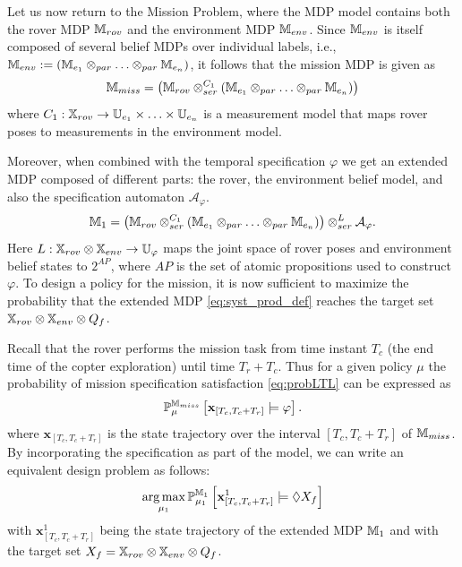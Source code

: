 \documentclass[conference]{IEEEtran}
\begin{document}
Let us now return to the Mission Problem, where the MDP model contains both the rover MDP $\mathbb{M}_{rov}$ and the environment MDP $\mathbb{M}_{env}$. Since $\mathbb{M}_{env}$ is itself composed of several belief MDPs over individual labels, i.e., $\mathbb{M}_{env}:=\left( \mathbb{M}_{e_1} \otimes_{par} \ldots \otimes_{par} \mathbb{M}_{e_n} \right) $, it follows that the mission MDP is given as
\begin{equation}
  \mathbb{M}_{miss} = \left( \mathbb{M}_{rov} \otimes_{ser}^{C_1}\left( \mathbb{M}_{e_1} \otimes_{par} \ldots \otimes_{par} \mathbb{M}_{e_n} \right) \right)
\end{equation}
where $C_1 : \mathbb{X}_{rov} \rightarrow \mathbb{U}_{e_1} \times \ldots \times \mathbb{U}_{e_n}$ is a measurement model that maps rover poses to measurements in the environment model.

Moreover, when combined with the temporal specification $\varphi$ we get an extended MDP composed of different parts: the rover, the environment belief model, and also the specification automaton $\mathcal A_\varphi$.
 \begin{equation}
\label{eq:syst_prod_def}
	\MDP_1 = \left( \MDP_{rov} \otimes_{ser}^{C_1} \left( \MDP_{e_1} \otimes_{par} \ldots \otimes_{par} \MDP_{e_n} \right) \right) \otimes_{ser}^{L} \mathcal A_{\varphi}.
\end{equation}
Here $L : \mathbb{X}_{rov} \otimes \mathbb{X}_{env} \rightarrow \mathbb{U}_{\varphi}$ maps the joint space of rover poses and environment belief states to $2^{AP}$, where $AP$ is the set of atomic propositions used to construct $\varphi$. To design a policy for the mission, it is now sufficient to maximize the probability that the extended MDP \eqref{eq:syst_prod_def} reaches the target set $\mathbb{X}_{rov} \otimes \mathbb{X}_{env} \otimes Q_f$.

Recall that the rover performs the mission task from time instant $T_c$ (the end time of the copter exploration) until time $T_r + T_c$. Thus for a given  policy $\mu$ the probability of mission specification satisfaction \eqref{eq:probLTL} can be expressed as
\begin{equation}
\begin{aligned}
	\mathbb{P}_\mu^{\mathbb{M}_{miss}} \left[ \mathbf{x}_{[T_c,T_c+T_r]} \models \varphi \right].
\end{aligned}
\end{equation}
where $\mathbf{x}_{[T_c,T_c+T_r]}$ is the state trajectory over the interval $[T_c,T_c+T_r]$ of $\mathbb{M}_{miss}$. By incorporating the specification as part of the model, we can write an equivalent design problem as follows:
\begin{equation}
  \label{eq:ev_target}
  \argmax_{\mu_1} \mathbb{P}_{\mu_1}^{\MDP_1} \left[ \mathbf{x}_{[T_c,T_c+T_r]}^1 \models \lozenge X_f \right]
\end{equation}
with $\mathbf{x}_{[T_c,T_c+T_r]}^1$ being the state trajectory of the extended MDP $\mathbb{M}_1$ and with the target set $X_f=\mathbb{X}_{rov} \otimes \mathbb{X}_{env} \otimes Q_f$.
\end{document}
